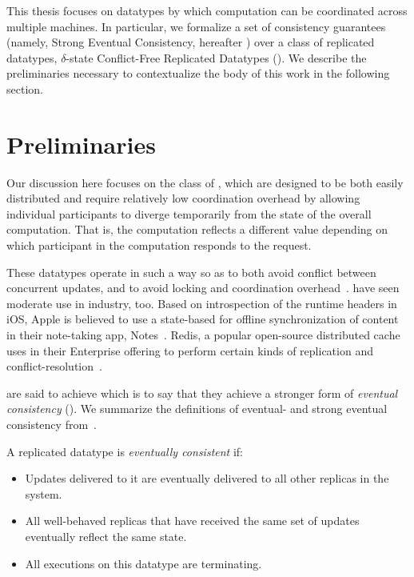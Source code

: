 This thesis focuses on datatypes by which computation can be coordinated across
multiple machines. In particular, we formalize a set of consistency guarantees
(namely, Strong Eventual Consistency, hereafter \SEC) over a class of replicated
datatypes, $\delta$-state Conflict-Free Replicated Datatypes (\CRDTs). We
describe the preliminaries necessary to contextualize the body of this work in
the following section.

\section{Preliminaries}
Our discussion here focuses on the class of \CRDTs, which are designed to be
both easily distributed and require relatively low coordination overhead by
allowing individual participants to diverge temporarily from the state of the
overall computation. That is, the computation reflects a different value
depending on which participant in the computation responds to the request.

These datatypes operate in such a way so as to both avoid conflict between
concurrent updates, and to avoid locking and coordination
overhead~\citep{shapiro11}. \CRDTs have seen moderate use in industry, too.
Based on introspection of the runtime headers in iOS, Apple is believed to use a
state-based \CRDT for offline synchronization of content in their note-taking
app, Notes~\citep{applenotes}.  Redis, a popular open-source distributed cache
uses \CRDTs in their Enterprise offering to perform certain kinds of replication
and conflict-resolution~\citep{redis}.

\CRDTs are said to achieve \SEC which is to say that they achieve a stronger
form of \textit{eventual consistency} (\EC). We summarize the definitions of
eventual- and strong eventual consistency from~\cite{shapiro11}.

\begin{definition}
  \label{def:eventual-consistency}
  A replicated datatype is \emph{eventually consistent} if:
  \begin{itemize}
    \item Updates delivered to it are eventually delivered to all other replicas
      in the system.
    \item All well-behaved replicas that have received the same set of updates
      eventually reflect the same state.
    \item All executions on this datatype are terminating.
  \end{itemize}
\end{definition}

